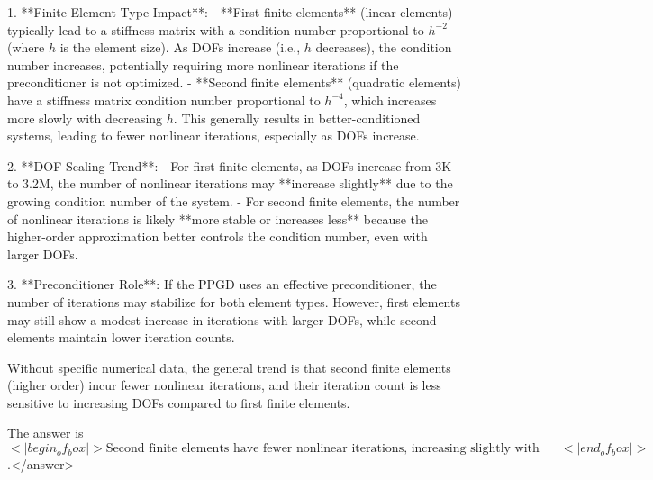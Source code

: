 1. **Finite Element Type Impact**:  
   - **First finite elements** (linear elements) typically lead to a stiffness matrix with a condition number proportional to \( h^{-2} \) (where \( h \) is the element size). As DOFs increase (i.e., \( h \) decreases), the condition number increases, potentially requiring more nonlinear iterations if the preconditioner is not optimized.  
   - **Second finite elements** (quadratic elements) have a stiffness matrix condition number proportional to \( h^{-4} \), which increases more slowly with decreasing \( h \). This generally results in better-conditioned systems, leading to fewer nonlinear iterations, especially as DOFs increase.  

2. **DOF Scaling Trend**:  
   - For first finite elements, as DOFs increase from 3K to 3.2M, the number of nonlinear iterations may **increase slightly** due to the growing condition number of the system.  
   - For second finite elements, the number of nonlinear iterations is likely **more stable or increases less** because the higher-order approximation better controls the condition number, even with larger DOFs.  

3. **Preconditioner Role**:  
   If the PPGD uses an effective preconditioner, the number of iterations may stabilize for both element types. However, first elements may still show a modest increase in iterations with larger DOFs, while second elements maintain lower iteration counts.  

Without specific numerical data, the general trend is that second finite elements (higher order) incur fewer nonlinear iterations, and their iteration count is less sensitive to increasing DOFs compared to first finite elements.  

The answer is \(<|begin_of_box|>\text{Second finite elements have fewer nonlinear iterations, increasing slightly with DOFs; first elements have more iterations, increasing more with DOFs}<|end_of_box|>\).</answer>